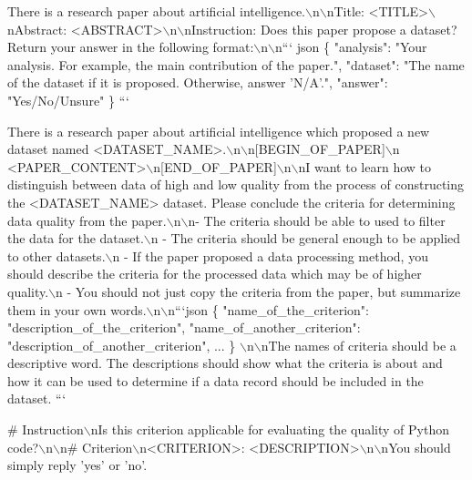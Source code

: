 \begin{tcolorbox}
    [title = {Judge if a paper releases a dataset.}, breakable] \footnotesize
    There is a research paper about artificial intelligence.$\backslash$n$\backslash$nTitle:
    <TITLE>$\backslash$nAbstract: <ABSTRACT>$\backslash$n$\backslash$nInstruction:
    Does this paper propose a dataset? Return your answer in the following format:$\backslash$n$\backslash$n```
    json \{ "analysis": "Your analysis. For example, the main contribution of the
    paper.", "dataset": "The name of the dataset if it is proposed. Otherwise,
    answer 'N/A'.", "answer": "Yes/No/Unsure" \} ```
\end{tcolorbox}

\begin{tcolorbox}
    [title = {Extract quality criteria from papers.}, breakable] \footnotesize
    There is a research paper about artificial intelligence which proposed a new
    dataset named <DATASET\_NAME>.$\backslash$n$\backslash$n[BEGIN\_OF\_PAPER]$\backslash$n
    <PAPER\_CONTENT>$\backslash$n[END\_OF\_PAPER]$\backslash$n$\backslash$nI want
    to learn how to distinguish between data of high and low quality from the process
    of constructing the <DATASET\_NAME> dataset. Please conclude the criteria
    for determining data quality from the paper.$\backslash$n$\backslash$n- The
    criteria should be able to used to filter the data for the dataset.$\backslash$n
    - The criteria should be general enough to be applied to other datasets.$\backslash$n
    - If the paper proposed a data processing method, you should describe the criteria
    for the processed data which may be of higher quality.$\backslash$n - You
    should not just copy the criteria from the paper, but summarize them in your
    own words.$\backslash$n$\backslash$n```json \{ "name\_of\_the\_criterion": "description\_of\_the\_criterion",
    "name\_of\_another\_criterion": "description\_of\_another\_criterion", ...
    \} $\backslash$n$\backslash$nThe names of criteria should be a descriptive word.
    The descriptions should show what the criteria is about and how it can be
    used to determine if a data record should be included in the dataset. ```
\end{tcolorbox}

\begin{tcolorbox}
    [title = {Retrieve Code Criteria},breakable] \footnotesize \# Instruction$\backslash$nIs
    this criterion applicable for evaluating the quality of Python code?$\backslash$n$\backslash$n\#
    Criterion$\backslash$n<CRITERION>: <DESCRIPTION>$\backslash$n$\backslash$nYou
    should simply reply 'yes' or 'no'.
\end{tcolorbox}

